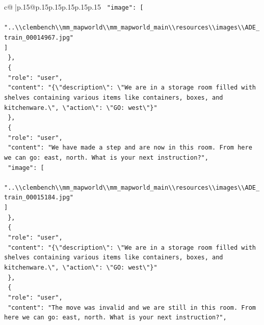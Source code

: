 \documentclass{article}
\begin{document}
{\begin{supertabular}{c@{$\;$}|p{.15\linewidth}@{}p{.15\linewidth}p{.15\linewidth}p{.15\linewidth}p{.15\linewidth}p{.15\linewidth}}
{{{\texttt{    "image": {[}} \\
\texttt{      "..\textbackslash{}\textbackslash{}clembench\textbackslash{}\textbackslash{}mm\_mapworld\textbackslash{}\textbackslash{}mm\_mapworld\_main\textbackslash{}\textbackslash{}resources\textbackslash{}\textbackslash{}images\textbackslash{}\textbackslash{}ADE\_train\_00014967.jpg"} \\
\texttt{    {]}} \\
\texttt{  \},} \\
\texttt{  \{} \\
\texttt{    "role": "user",} \\
\texttt{    "content": "\{\textbackslash{}"description\textbackslash{}": \textbackslash{}"We are in a storage room filled with shelves containing various items like containers, boxes, and kitchenware.\textbackslash{}", \textbackslash{}"action\textbackslash{}": \textbackslash{}"GO: west\textbackslash{}"\}"} \\
\texttt{  \},} \\
\texttt{  \{} \\
\texttt{    "role": "user",} \\
\texttt{    "content": "We have made a step and are now in this room. From here we can go: east, north. What is your next instruction?",} \\
\texttt{    "image": {[}} \\
\texttt{      "..\textbackslash{}\textbackslash{}clembench\textbackslash{}\textbackslash{}mm\_mapworld\textbackslash{}\textbackslash{}mm\_mapworld\_main\textbackslash{}\textbackslash{}resources\textbackslash{}\textbackslash{}images\textbackslash{}\textbackslash{}ADE\_train\_00015184.jpg"} \\
\texttt{    {]}} \\
\texttt{  \},} \\
\texttt{  \{} \\
\texttt{    "role": "user",} \\
\texttt{    "content": "\{\textbackslash{}"description\textbackslash{}": \textbackslash{}"We are in a storage room filled with shelves containing various items like containers, boxes, and kitchenware.\textbackslash{}", \textbackslash{}"action\textbackslash{}": \textbackslash{}"GO: west\textbackslash{}"\}"} \\
\texttt{  \},} \\
\texttt{  \{} \\
\texttt{    "role": "user",} \\
\texttt{    "content": "The move was invalid and we are still in this room. From here we can go: east, north. What is your next instruction?",} \\
}}}
\end{supertabular}}
\end{document}
